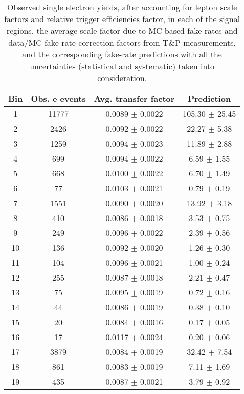 \begin{table}
\centering
\caption{Observed single electron yields, after accounting for lepton scale factors
and relative trigger efficiencies factor, in each of the signal regions, the 
average scale factor due to MC-based fake rates and data/MC fake rate correction
factors from T\&P measurements, and the corresponding fake-rate predictions with all the uncertainties (statistical and systematic) taken into consideration.}
\label{tab:fakeRatePredictions}
\begin{tabular}{c|c|c|c}
Bin & Obs. e events & Avg. transfer factor  & Prediction \\ \hline\hline
1 & 11777  & 0.0089  $\pm$  0.0022  & 105.30 $\pm$ 25.45   \\\hline
2 & 2426  & 0.0092  $\pm$  0.0022  & 22.27 $\pm$ 5.38   \\\hline
3 & 1259  & 0.0094  $\pm$  0.0023  & 11.89 $\pm$ 2.88   \\\hline
4 & 699  & 0.0094  $\pm$  0.0022  & 6.59 $\pm$ 1.55   \\\hline
5 & 668  & 0.0100  $\pm$  0.0022  & 6.70 $\pm$ 1.49   \\\hline
6 & 77  & 0.0103  $\pm$  0.0021  & 0.79 $\pm$ 0.19   \\\hline
7 & 1551  & 0.0090  $\pm$  0.0020  & 13.92 $\pm$ 3.18   \\\hline
8 & 410  & 0.0086  $\pm$  0.0018  & 3.53 $\pm$ 0.75   \\\hline
9 & 249  & 0.0096  $\pm$  0.0022  & 2.39 $\pm$ 0.56   \\\hline
10 & 136  & 0.0092  $\pm$  0.0020  & 1.26 $\pm$ 0.30   \\\hline
11 & 104  & 0.0096  $\pm$  0.0021  & 1.00 $\pm$ 0.24   \\\hline
12 & 255  & 0.0087  $\pm$  0.0018  & 2.21 $\pm$ 0.47   \\\hline
13 & 75  & 0.0095  $\pm$  0.0019  & 0.72 $\pm$ 0.16   \\\hline
14 & 44  & 0.0086  $\pm$  0.0019  & 0.38 $\pm$ 0.10   \\\hline
15 & 20  & 0.0084  $\pm$  0.0016  & 0.17 $\pm$ 0.05   \\\hline
16 & 17  & 0.0117  $\pm$  0.0024  & 0.20 $\pm$ 0.06   \\\hline
17 & 3879  & 0.0084  $\pm$  0.0019  & 32.42 $\pm$ 7.54   \\\hline
18 & 861  & 0.0083  $\pm$  0.0019  & 7.11 $\pm$ 1.69   \\\hline
19 & 435  & 0.0087  $\pm$  0.0021  & 3.79 $\pm$ 0.92   \\\hline

\end{tabular}
\end{table}
